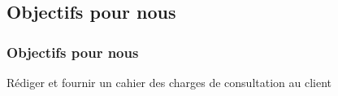 \subsection{Objectifs pour nous}

\begin{frame}
	\frametitle{Objectifs pour nous}
	\begin{block}{}
		Rédiger et fournir un cahier des charges de consultation au client
	\end{block}
\end{frame}

